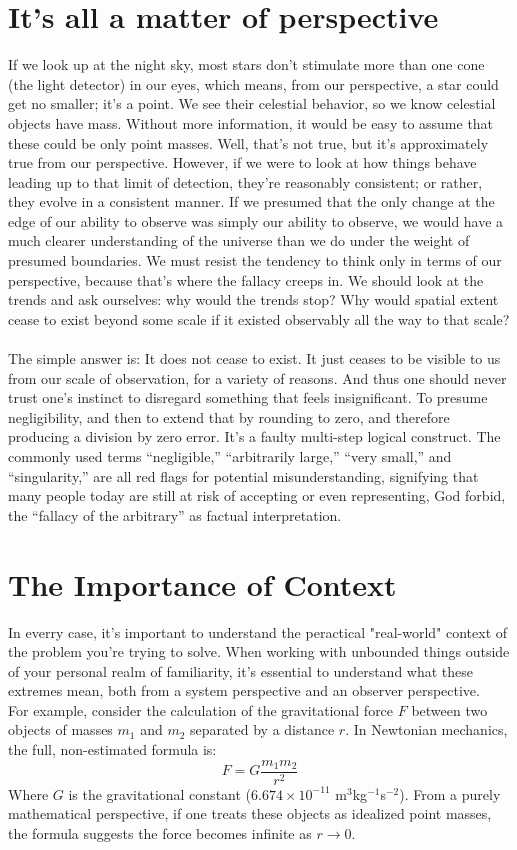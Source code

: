 \documentclass[twoside,twocolumn,9pt]{article}
\begin{document}
\section{It's all a matter of perspective}
If we look up at the night sky, most stars don't stimulate more than one cone (the light detector) in our eyes, which means, from our perspective, a star could get no smaller; it's a point. We see their celestial behavior, so we know celestial objects have mass. Without more information, it would be easy to assume that these could be only point masses. Well, that's not true, but it's approximately true from our perspective. However, if we were to look at how things behave leading up to that limit of detection, they're reasonably consistent; or rather, they evolve in a consistent manner. If we presumed that the only change at the edge of our ability to observe was simply our ability to observe, we would have a much clearer understanding of the universe than we do under the weight of presumed boundaries. We must resist the tendency to think only in terms of our perspective, because that's where the fallacy creeps in. We should look at the trends and ask ourselves: why would the trends stop? Why would spatial extent cease to exist beyond some scale if it existed observably all the way to that scale?\\
\\
The simple answer is: It does not cease to exist. It just ceases to be visible to us from our scale of observation, for a variety of reasons. And thus one should never trust one's instinct to disregard something that feels insignificant. To presume negligibility, and then to extend that by rounding to zero, and therefore producing a division by zero error. It's a faulty multi-step logical construct. The commonly used terms ``negligible,'' ``arbitrarily large,'' ``very small,'' and ``singularity,'' are all red flags for potential misunderstanding, signifying that many people today are still at risk of accepting or even representing, God forbid, the ``fallacy of the arbitrary'' as factual interpretation.

\section{The Importance of Context}
In everry case, it's important to understand the peractical "real-world" context of the problem you're trying to solve. When working with unbounded things outside of your personal realm of familiarity, it's essential to understand what these extremes mean, both from a system perspective and an observer perspective.
\\
For example, consider the calculation of the gravitational force $F$ between two objects of masses $m_1$ and $m_2$ separated by a distance $r$. In Newtonian mechanics, the full, non-estimated formula is:
\begin{equation}
F = G \frac{m_1 m_2}{r^2}
\end{equation}
Where $G$ is the gravitational constant ($6.674 \times 10^{-11}$ m$^3$kg$^{-1}$s$^{-2}$). From a purely mathematical perspective, if one treats these objects as idealized point masses, the formula suggests the force becomes infinite as $r \to 0$. 
\end{document}
